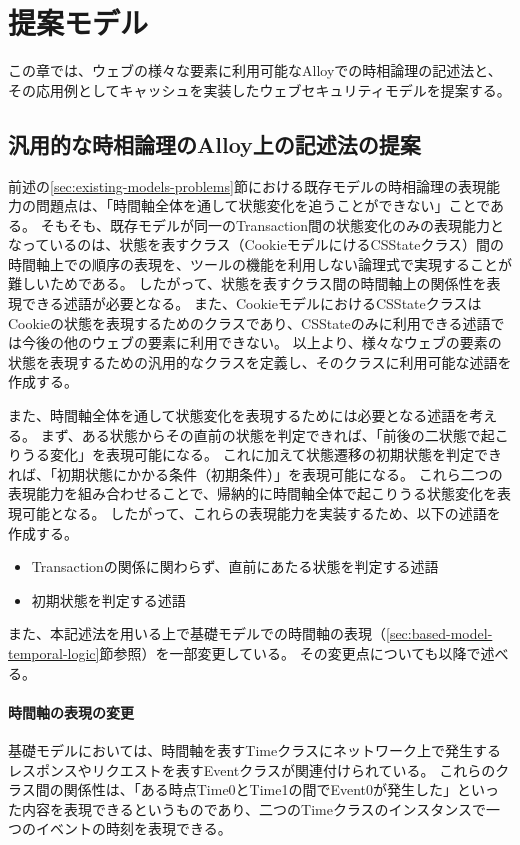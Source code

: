 \documentclass[12pt,a4paper]{jbook}
\begin{document}
\newpage

\chapter{提案モデル}
この章では、ウェブの様々な要素に利用可能なAlloyでの時相論理の記述法と、その応用例としてキャッシュを実装したウェブセキュリティモデルを提案する。

\section{汎用的な時相論理のAlloy上の記述法の提案}
\label{sec:ProposedModel-TemporalLogic}
前述の\ref{sec:existing-models-problems}節における既存モデルの時相論理の表現能力の問題点は、「時間軸全体を通して状態変化を追うことができない」ことである。
そもそも、既存モデルが同一のTransaction間の状態変化のみの表現能力となっているのは、状態を表すクラス（CookieモデルにけるCSStateクラス）間の時間軸上での順序の表現を、ツールの機能を利用しない論理式で実現することが難しいためである。
したがって、状態を表すクラス間の時間軸上の関係性を表現できる述語が必要となる。
また、CookieモデルにおけるCSStateクラスはCookieの状態を表現するためのクラスであり、CSStateのみに利用できる述語では今後の他のウェブの要素に利用できない。
以上より、様々なウェブの要素の状態を表現するための汎用的なクラスを定義し、そのクラスに利用可能な述語を作成する。

また、時間軸全体を通して状態変化を表現するためには必要となる述語を考える。
まず、ある状態からその直前の状態を判定できれば、「前後の二状態で起こりうる変化」を表現可能になる。
これに加えて状態遷移の初期状態を判定できれば、「初期状態にかかる条件（初期条件）」を表現可能になる。
これら二つの表現能力を組み合わせることで、帰納的に時間軸全体で起こりうる状態変化を表現可能となる。
したがって、これらの表現能力を実装するため、以下の述語を作成する。
\begin{itemize}
\item Transactionの関係に関わらず、直前にあたる状態を判定する述語
\item 初期状態を判定する述語
\end{itemize}

また、本記述法を用いる上で基礎モデルでの時間軸の表現（\ref{sec:based-model-temporal-logic}節参照）を一部変更している。
その変更点についても以降で述べる。

\subsubsection{時間軸の表現の変更}
基礎モデル\cite{based-model}においては、時間軸を表すTimeクラスにネットワーク上で発生するレスポンスやリクエストを表すEventクラスが関連付けられている。
これらのクラス間の関係性は、「ある時点Time0とTime1の間でEvent0が発生した」といった内容を表現できるというものであり、二つのTimeクラスのインスタンスで一つのイベントの時刻を表現できる。
\end{document}
